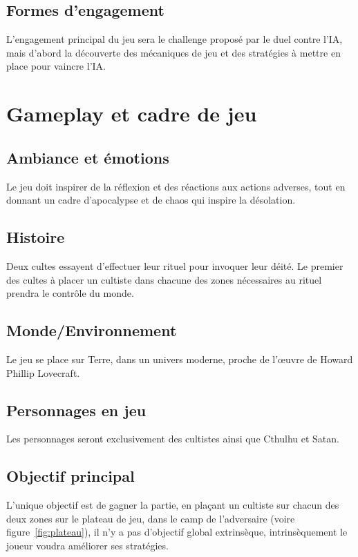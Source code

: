 \documentclass[a4paper]{scrreprt}
\begin{document}
\section{Formes d'engagement}

L'engagement principal du jeu sera le challenge proposé par le duel contre l'IA, mais d'abord la découverte des mécaniques de jeu et des stratégies à mettre en place pour vaincre l'IA.



\chapter{Gameplay et cadre de jeu}

\section{Ambiance et émotions}

Le jeu doit inspirer de la réflexion et des réactions aux actions adverses, tout en donnant un cadre d'apocalypse et de chaos qui inspire la désolation.

\section{Histoire}

Deux cultes essayent d'effectuer leur rituel pour invoquer leur déité. Le premier des cultes à placer un cultiste dans chacune des zones nécessaires au rituel prendra le contrôle du monde.

\section{Monde/Environnement}

Le jeu se place sur Terre, dans un univers moderne, proche de l'\oe uvre de Howard Phillip Lovecraft.

\section{Personnages en jeu}
Les personnages seront exclusivement des cultistes ainsi que Cthulhu et Satan.

\section{Objectif principal}

L'unique objectif est de gagner la partie, en plaçant un cultiste sur chacun des deux zones sur le plateau de jeu, dans le camp de l'adversaire (voire figure~\ref{fig:plateau}), il n'y a pas d'objectif global extrinsèque, intrinsèquement le joueur voudra améliorer ses stratégies.
\end{document}
